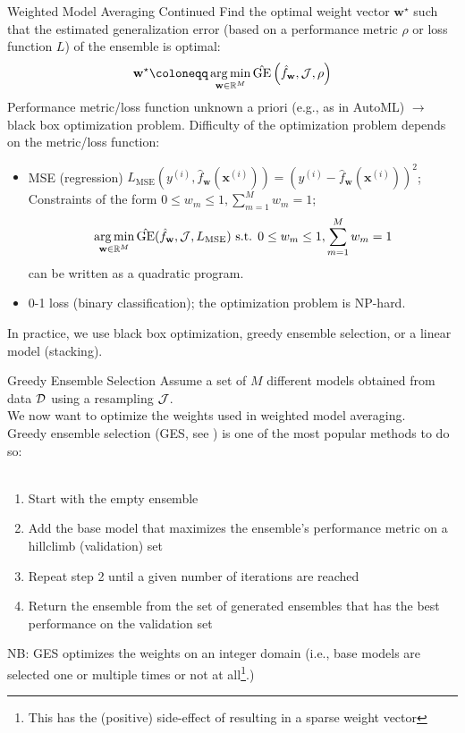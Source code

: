 \documentclass[10pt,compress,t,notes=noshow, xcolor=table]{beamer}
\begin{document}
\begin{frame}{Weighted Model Averaging Continued}
Find the optimal weight vector $\mathbf{w}^{\star}$ such that the estimated generalization error (based on a performance metric $\rho$ or loss function $L$) of the ensemble is optimal:
$$\mathbf{w}^{\star} \coloneqq \operatorname*{arg\,min}_{\mathbf{w} \in \mathbb{R}^{M}} \hat{\text{GE}}\left(\hat{f}_{\mathbf{w}}, \JJ, \rho\right)$$
\vfill
Performance metric/loss function unknown a priori (e.g., as in AutoML) $\rightarrow$ black box optimization problem.
\vfill
Difficulty of the optimization problem depends on the metric/loss function:
\begin{itemize}
    \item MSE (regression) $L_{\mathrm{MSE}}(y^{(i)}, \hat{f}_{\mathbf{w}}(\mathbf{x}^{(i)})) = (y^{(i)} - \hat{f}_{\mathbf{w}}(\mathbf{x}^{(i)}))^{2}$;\\
          Constraints of the form $0 \le w_{m} \le 1, \sum_{m=1}^{M} w_{m} = 1$;\\
          $$\operatorname*{arg\,min}_{\mathbf{w} \in \mathbb{R}^{M}} \hat{\text{GE}}(\hat{f}_{\mathbf{w}}, \mathcal{J}, L_{\mathrm{MSE}}) \text{ s.t. } 0 \le w_{m} \le 1, \sum_{m=1}^{M} w_{m} = 1$$
          can be written as a quadratic program.
    \item 0-1 loss (binary classification); the optimization problem is NP-hard.
\end{itemize}
\vfill
In practice, we use black box optimization, greedy ensemble selection, or a linear model (stacking).
\end{frame}



\begin{vbframe}{Greedy Ensemble Selection}
Assume a set of $M$ different models obtained from data $\mathcal{D}$ using a resampling $\mathcal{J}$.\\
We now want to optimize the weights used in weighted model averaging.\\
\vfill
Greedy ensemble selection (GES, see ) is one of the most popular methods to do so:\\\
\begin{enumerate}
    \item Start with the empty ensemble
    \item Add the base model that maximizes the ensemble's performance metric on a hillclimb (validation) set
    \item Repeat step 2 until a given number of iterations are reached
    \item Return the ensemble from the set of generated ensembles that has the best performance on the validation set
\end{enumerate}
\vfill
NB: GES optimizes the weights on an integer domain (i.e., base models are selected one or multiple times or not at all\footnote{This has the (positive) side-effect of resulting in a sparse weight vector}.)
\end{vbframe}
\end{document}
